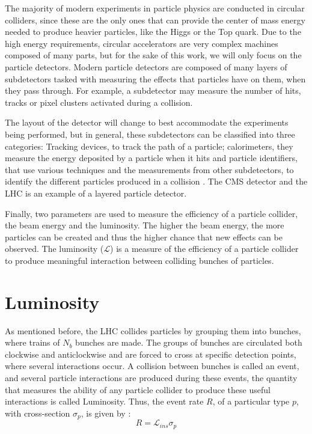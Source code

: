 The majority of modern experiments in particle physics are conducted in circular colliders, since these are the only ones that can provide the center of mass energy needed to produce heavier particles, like the Higgs or the Top quark. Due to the high energy requirements, circular accelerators are very complex machines composed of many parts, but for the sake of this work, we will only focus on the particle detectors. Modern particle detectors are composed of many layers of subdetectors tasked with measuring the effects that particles have on them, when they pass through. For example, a subdetector may measure the number of hits, tracks or pixel clusters activated during a collision.

The layout of the detector will change to best accommodate the experiments being performed, but in general, these subdetectors can be classified into three categories: Tracking devices, to track the path of a particle; calorimeters, they measure the energy deposited by a particle when it hits and particle identifiers, that use various techniques and the measurements from other subdetectors, to identify the different particles produced in a collision \cite{detector}. The CMS detector and the LHC is an example of a layered particle detector.

Finally, two parameters are used to measure the efficiency of a particle collider, the beam energy and the luminosity.  The higher the beam energy, the more particles can be created and thus the higher chance that new effects can be observed. The luminosity ($\mathcal{L}$) is a measure of the efficiency of a particle collider to produce meaningful interaction between colliding bunches of particles.

\section{Luminosity }

As mentioned before, the LHC collides particles by grouping them into bunches, where trains of $N_b$ bunches are made. The groups of bunches are circulated both clockwise and anticlockwise and are forced to cross at specific detection points, where several interactions occur. A collision between bunches is called an event, and several particle interactions are produced during these events, the quantity that measures the ability of any particle collider to produce these useful interactions is called Luminosity. Thus, the event rate $R$, of a particular type $p$, with cross-section  $\sigma_p$, is given by \cite{White}:
\begin{equation}
    R=\mathcal{L}_{ins}\sigma_p
    \label{lumy0}
\end{equation}

